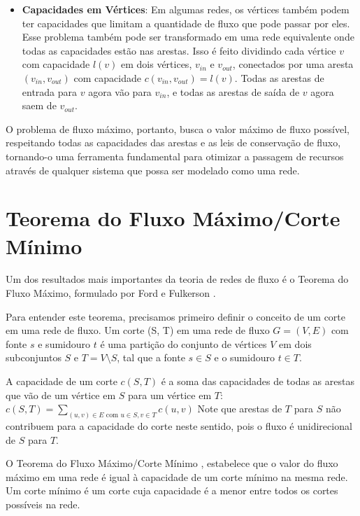 \documentclass[12pt]{article}
\begin{document}
\begin{itemize}
\begin{itemize}
    \end{itemize}
    \item \textbf{ Capacidades em Vértices}: Em algumas redes, os vértices também podem ter capacidades que limitam a quantidade de fluxo que pode passar por eles. Esse problema também pode ser transformado em uma rede equivalente onde todas as capacidades estão nas arestas. Isso é feito dividindo cada vértice $v$ com capacidade $l(v)$ em dois vértices, $v_{in}$ e $v_{out}$, conectados por uma aresta $(v_{in}, v_{out})$ com capacidade $c(v_{in}, v_{out}) = l(v)$. Todas as arestas de entrada para $v$ agora vão para $v_{in}$, e todas as arestas de saída de $v$ agora saem de $v_{out}$.
\end{itemize}
 
\noindent O problema de fluxo máximo, portanto, busca o valor máximo de fluxo possível, respeitando todas as capacidades das arestas e as leis de conservação de fluxo, tornando-o uma ferramenta fundamental para otimizar a passagem de recursos através de qualquer sistema que possa ser modelado como uma rede.

\section{Teorema do Fluxo Máximo/Corte Mínimo}

Um dos resultados mais importantes da teoria de redes de fluxo é o Teorema do Fluxo Máximo, formulado por Ford e Fulkerson \cite{ford1956maximal}.

\noindent Para entender este teorema, precisamos primeiro definir o conceito de um corte em uma rede de fluxo. Um corte (S, T) em uma rede de fluxo $G=(V, E)$ com fonte $s$ e sumidouro $t$ é uma partição do conjunto de vértices $V$ em dois subconjuntos $S$ e $T = V \setminus S$, tal que a fonte $s \in S$ e o sumidouro $t \in T$.

A capacidade de um corte $c(S, T)$ é a soma das capacidades de todas as arestas que vão de um vértice em $S$ para um vértice em $T$: $c(S, T) = \sum_{(u,v) \in E \text{ com } u \in S, v \in T} c(u, v)$ Note que arestas de $T$ para $S$ não contribuem para a capacidade do corte neste sentido, pois o fluxo é unidirecional de $S$ para $T$.

\noindent O Teorema do Fluxo Máximo/Corte Mínimo \cite{cormen2009}, estabelece que o valor do fluxo máximo em uma rede é igual à capacidade de um corte mínimo na mesma rede. Um corte mínimo é um corte cuja capacidade é a menor entre todos os cortes possíveis na rede.
\end{document}
